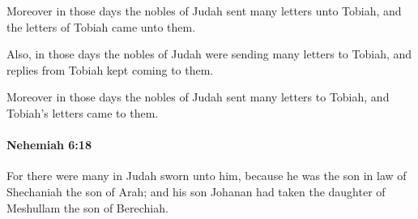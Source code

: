 			\begin{versebox}
					\item[BHS] 
					\item[LXX] 
					\item[ASV] Moreover in those days the nobles of Judah sent many letters unto Tobiah, and the letters of Tobiah came unto them.
					\item[NIV] Also, in those days the nobles of Judah were sending many letters to Tobiah, and replies from Tobiah kept coming to them.
					\item[NRSV] Moreover in those days the nobles of Judah sent many letters to Tobiah, and Tobiah’s letters came to them.
			\end{versebox}

		\paragraph{Nehemiah 6:18} %
			\label{NEHEMIAH-6-18}

			For there were many in Judah sworn unto him, because he was the son in law of Shechaniah the son of Arah; and his son Johanan had taken the daughter of Meshullam the son of Berechiah.

